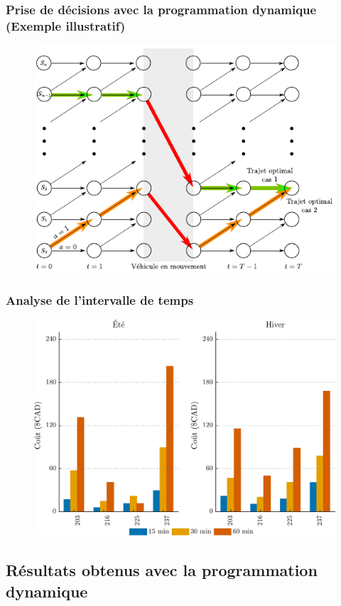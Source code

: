 \documentclass[french]{beamer}
\begin{document}
{\begin{frame}
\frametitle{Prise de décisions avec la programmation dynamique (Exemple illustratif)}
\begin{center}
\begin{figure}
\includegraphics[width=0.7\linewidth]{figDinamycProgram02.pdf}
\end{figure} 
 \end{center}
\end{frame}


\begin{frame}
\frametitle{Analyse de l'intervalle de temps}
\begin{center}
\begin{figure}
\includegraphics[width=0.9\linewidth]{figresDeltaWithoutGasBWcolor02-Sout2.pdf}
\end{figure} 
 \end{center}
\end{frame}

\subsection{Résultats obtenus avec la programmation dynamique}

}
\end{document}
